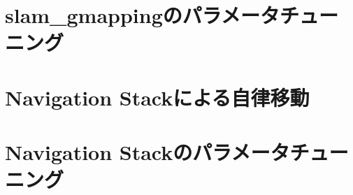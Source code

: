\documentclass[uplatex, a4paper]{jsreport}
\begin{document}
\chapter{\textsf{slam\_gmapping}のパラメータチューニング}





\chapter{Navigation Stackによる自律移動}





\chapter{Navigation Stackのパラメータチューニング}



\end{document}
